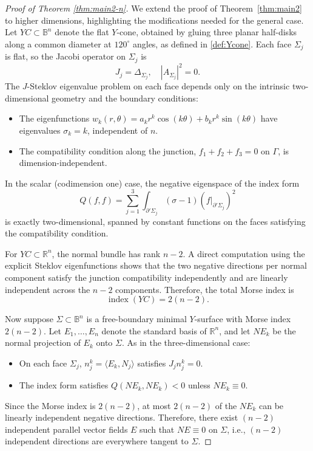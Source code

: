 \documentclass[11pt]{amsart}
\numberwithin{equation}{section}
\theoremstyle{theorem}
\theoremstyle{definition}
\numberwithin{equation}{section}
\begin{document}
\begin{proof}[Proof of Theorem \ref{thm:main2-n}]
We extend the proof of Theorem~\ref{thm:main2} to higher dimensions, highlighting the modifications needed for the general case.  \\ 
Let $YC \subset \mathbb{B}^n$ denote the flat $Y$-cone, obtained by gluing three planar half-disks along a common diameter at $120^\circ$ angles, as defined in \ref{def:Ycone}. Each face $\Sigma_j$ is flat, so the Jacobi operator on $\Sigma_j$ is
\[
J_j = \Delta_{\Sigma_j}, \quad |A_{\Sigma_j}|^2 = 0.
\]
The $J$-Steklov eigenvalue problem on each face depends only on the intrinsic two-dimensional geometry and the boundary conditions:
\begin{itemize}
    \item The eigenfunctions $w_k(r,\theta) = a_k r^k \cos(k\theta) + b_k r^k \sin(k\theta)$ have eigenvalues $\sigma_k = k$, independent of $n$.
    \item The compatibility condition along the junction, $f_1 + f_2 + f_3 = 0$ on $\Gamma$, is dimension-independent.
\end{itemize}

In the scalar (codimension one) case, the negative eigenspace of the index form
\[
Q(f,f) = \sum_{j=1}^3 \int_{\partial' \Sigma_j} (\sigma - 1) (f|_{\partial' \Sigma_j})^2
\]
is exactly two-dimensional, spanned by constant functions on the faces satisfying the compatibility condition.  

For $YC \subset \mathbb{R}^n$, the normal bundle has rank $n-2$. A direct computation using the explicit Steklov eigenfunctions shows that the two negative directions per normal component satisfy the junction compatibility independently and are linearly independent across the $n-2$ components. Therefore, the total Morse index is
\[
\operatorname{index}(YC) = 2(n-2).
\]

Now suppose $\Sigma \subset \mathbb{B}^n$ is a free-boundary minimal $Y$-surface with Morse index $2(n-2)$. Let $E_1,\dots,E_n$ denote the standard basis of $\mathbb{R}^n$, and let $NE_k$ be the normal projection of $E_k$ onto $\Sigma$. As in the three-dimensional case:
\begin{itemize}
    \item On each face $\Sigma_j$, $n^k_j = \langle E_k, N_j \rangle$ satisfies $J_j n^k_j = 0$.
    \item The index form satisfies $Q(NE_k,NE_k) < 0$ unless $NE_k \equiv 0$.
\end{itemize}
Since the Morse index is $2(n-2)$, at most $2(n-2)$ of the $NE_k$ can be linearly independent negative directions. Therefore, there exist $(n-2)$ independent parallel vector fields $E$ such that $NE \equiv 0$ on $\Sigma$, i.e., $(n-2)$ independent directions are everywhere tangent to $\Sigma$.  


\end{proof}
\end{document}
